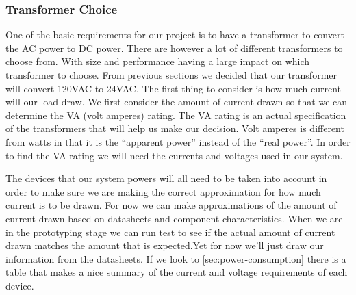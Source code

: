 
%

\subsubsection{Transformer Choice}
One of the basic requirements for our project is to have a transformer to
convert the AC power to DC power. There are however a lot of different
transformers to choose from. With size and performance having a large impact on
which transformer to choose. From previous sections we decided that our
transformer will convert 120VAC to 24VAC. The first thing to consider is how
much current will our load draw. We first consider the amount of current drawn
so that we can determine the VA (volt amperes) rating. The VA rating is an
actual specification of the transformers that will help us make our decision.
Volt amperes is different from watts in that it is the {}``apparent power{}''
instead of the {}``real power{}''. In order to find the VA rating we will need the
currents and voltages used in our system.

The devices that our system powers will all need to be taken
into account in order to make sure we are making the correct approximation
for how much current is to be drawn. For now we can make approximations of
the amount of current drawn based on datasheets and component
characteristics. When we are in the prototyping stage we can run test to see
if the actual amount of current drawn matches the amount that is expected.Yet
for now we{}'ll just draw our information from the datasheets. If we look to
\autoref{sec:power-consumption} there is a table that makes a nice summary of the
current and voltage requirements of each device.

